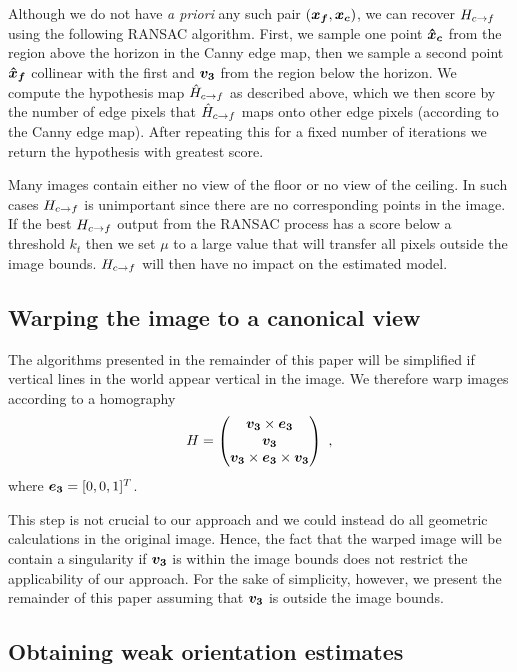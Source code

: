 Although we do not have \textit{a priori} any such pair
$(\boldsymbol{x_f},\boldsymbol{x_c})$, we can recover $H_{c \rightarrow f}$ using the following
RANSAC algorithm. First, we sample one point $\boldsymbol{\hat{x}_c}$ from
the region above the horizon in the Canny edge map, then we sample a
second point $\boldsymbol{\hat{x}_f}$ collinear with the first and
$\boldsymbol{v_3}$ from the region below the horizon. We compute the
hypothesis map $\hat{H}_{c \rightarrow f}$ as described above, which we then score by
the number of edge pixels that $\hat{H}_{c \rightarrow f}$ maps onto other edge pixels
(according to the Canny edge map). After repeating this for a fixed
number of iterations we return the hypothesis with greatest score.

Many images contain either no view of the floor or no view of the
ceiling. In such cases $H_{c \rightarrow f}$ is unimportant since there are no
corresponding points in the image. If the best $H_{c \rightarrow f}$ output from the
RANSAC process has a score below a threshold $k_t$ then we set $\mu$
to a large value that will transfer all pixels outside the image
bounds. $H_{c \rightarrow f}$ will then have no impact on the estimated model.

\subsection{Warping the image to a canonical view}
\label{sect:warp}

The algorithms presented in the remainder of this paper will be
simplified if vertical lines in the world appear vertical
in the image. We therefore warp images according to a homography
\begin{equation}
  H = 
  \begin{pmatrix}
    \boldsymbol{v_3} \times \boldsymbol{e_3} \\
    \boldsymbol{v_3} \\
    \boldsymbol{v_3} \times \boldsymbol{e_3} \times \boldsymbol{v_3}
  \end{pmatrix}
  ~,
\end{equation}
where $\boldsymbol{e_3}=[0,0,1]^T$.

This step is not crucial to our approach and we could instead do all
geometric calculations in the original image. Hence, the fact that the
warped image will be contain a singularity if $\boldsymbol{v_3}$ is within
the image bounds does not restrict the applicability of our
approach. For the sake of simplicity, however, we present the
remainder of this paper assuming that $\boldsymbol{v_3}$ is outside the
image bounds.

\subsection{Obtaining weak orientation estimates}
\label{sect:orient-est}

